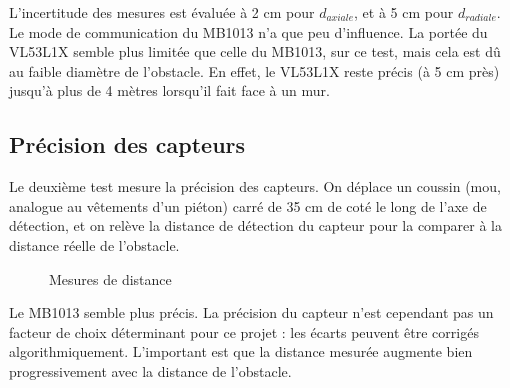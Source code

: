 \documentclass[a4paper, 11pt]{article}
\begin{document}
\par L'incertitude des mesures est évaluée à 2 cm pour $d_{axiale}$, et à 5 cm pour $d_{radiale}$. Le mode de communication du MB1013 n'a que peu d'influence. La portée du VL53L1X semble plus limitée que celle du MB1013, sur ce test, mais cela est dû au faible diamètre de l'obstacle. En effet, le VL53L1X reste précis (à 5 cm près) jusqu'à plus de 4 mètres lorsqu'il fait face à un mur.


\subsection{Précision des capteurs}

\par Le deuxième test mesure la précision des capteurs. On déplace un coussin (mou, analogue au vêtements d'un piéton) carré de 35 cm de coté le long de l'axe de détection, et on relève la distance de détection du capteur pour la comparer à la distance réelle de l'obstacle.

\begin{figure}[H]
\centering
{}
\caption{Mesures de distance}
\end{figure}

\par Le MB1013 semble plus précis. La précision du capteur n'est cependant pas un facteur de choix déterminant pour ce projet : les écarts peuvent être corrigés algorithmiquement. L'important est que la distance mesurée augmente bien progressivement avec la distance de l'obstacle.
\end{document}
